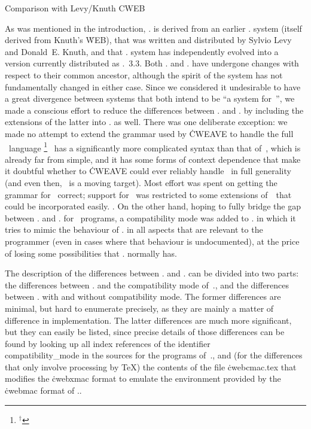 \beginsection Comparison with Levy/Knuth {\tentex CWEB}

As was mentioned in the introduction, \CWEBx. is derived from an earlier
\CWEB. system (itself derived from Knuth's \.{WEB}), that was written and
distributed by Sylvio Levy and Donald~E. Knuth, and that \CWEB.  system has
independently evolved into a version currently distributed as \CWEB.~3.3.
Both \CWEBx. and \LKC. have undergone changes with respect to their common
ancestor, although the spirit of the system has not fundamentally changed in
either case. Since we considered it undesirable to have a great divergence
between systems that both intend to be ``a  system for~\Cee'', we
made a conscious effort to reduce the differences between \CWEBx. and \LKC.
by including the extensions of the latter into \CWEBx. as well. There was
one deliberate exception: we made no attempt to extend the grammar used by
\.{CWEAVE} to handle the full \Cpp~language
\unskip\footnote{${}^\dagger$}
{\Cpp\ has a significantly more complicated syntax than that of~\Cee, which
 is already far from simple, and it has some forms of context dependence
 that make it doubtful whether to \.{CWEAVE} could ever reliably handle
 \Cpp\ in full generality (and even then, \Cpp\ is a moving target). Most
 effort was spent on getting the grammar for \Cee\ correct; support for
 \Cpp\ was restricted to some extensions of~\Cee\ that could be incorporated
 easily.
}.
On the other hand, hoping to fully bridge the gap between \LKC. and \CWEBx.
for \Cee~programs, a compatibility mode was added to \CWEBx. in which it
tries to mimic the behaviour of \LKC. in all aspects that are relevant to
the programmer (even in cases where that behaviour is undocumented), at the
price of losing some possibilities that \CWEBx. normally has.

The description of the differences between \LKC. and \CWEBx. can be divided
into two parts: the differences between \LKC. and the compatibility mode
of~\CWEBx., and the differences between \CWEBx. with and without
compatibility mode. The former differences are minimal, but hard to
enumerate precisely, as they are mainly a matter of difference in
implementation. The latter differences are much more significant, but they
can easily be listed, since precise details of those differences can be
found by looking up all index references of the identifier
\\{compatibility\_mode} in the sources for the programs of~\CWEBx., and (for
the differences that only involve processing by \TeX) the contents of the
file \.{cwebcmac.tex} that modifies the \.{cwebxmac} format to emulate the
environment provided by the \.{cwebmac} format of \LKC..

